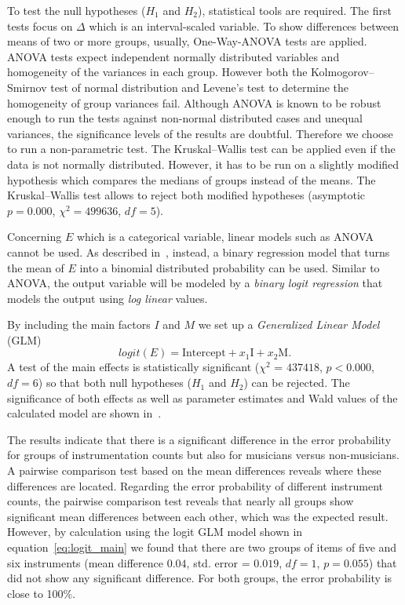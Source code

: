 To test the null hypotheses ($H_1$ and $H_2$), statistical tools are required.
The first tests focus on $\Delta$ which is an interval-scaled variable. To show differences between means of two or more groups, usually, One-Way-ANOVA tests are applied. ANOVA tests expect independent normally distributed variables and homogeneity of the variances in each group. However both the Kolmogorov--Smirnov test of normal distribution and Levene's test to determine the homogeneity of group variances fail. Although ANOVA is known to be robust enough to run the tests against non-normal distributed cases and unequal variances, the significance levels of the results are doubtful. Therefore we choose to run a non-parametric test. The Kruskal--Wallis test can be applied even if the data is not normally distributed. However, it has to be run on a slightly modified hypothesis which compares the medians of groups instead of the means. The Kruskal--Wallis test allows to reject both modified hypotheses (asymptotic $p = 0.000$, $\chi^2 = 499636$, $df=5$).
\par
Concerning $E$ which is a categorical variable, linear models such as ANOVA cannot be used.
As described in~\cite{jaeger08}, instead, a binary regression model that turns the mean of $E$ into a binomial distributed probability can be used.
Similar to ANOVA, the output variable will be modeled by a \emph{binary logit regression} that models the output using \emph{log linear} values.
\par
By including the main factors $I$ and $M$ we set up a \emph{Generalized Linear Model} (GLM)
\begin{equation}
    logit(E) =  \text{Intercept} + x_1 \text{I} + x_2 \text{M} .
    \label{eq:logit_main}
\end{equation}
A test of the main effects is statistically significant ($\chi^2$ = $437418$, $p < 0.000$, $df = 6$) so that both null hypotheses ($H_1$ and $H_2$) can be rejected. The significance of both effects as well as parameter estimates and Wald values of the calculated model are shown in~\cite{stoeter13}.
\par
The results indicate that there is a significant difference in the error probability for groups of instrumentation counts but also for musicians versus non-musicians. A pairwise comparison test based on the mean differences reveals where these differences are located. Regarding the error probability of different instrument counts, the pairwise comparison test reveals that nearly all groups show significant mean differences between each other, which was the expected result. However, by calculation using the logit GLM model shown in equation~\ref{eq:logit_main} we found that there are two groups of items of five and six instruments (mean difference $0.04$, std. error = $0.019$, $df = 1$, $p = 0.055$) that did not show any significant difference. For both groups, the error probability is close to 100\%.
